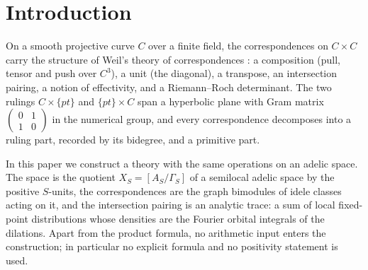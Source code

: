 \documentclass[11pt]{amsart}
\theoremstyle{definition}
\theoremstyle{remark}
\begin{document}
\maketitle

\tableofcontents

\section{Introduction}\label{sec:intro}

On a smooth projective curve $C$ over a finite field, the correspondences on
$C\times C$ carry the structure of Weil's theory of correspondences
\cite{Weil1948}: a composition (pull, tensor and push
over $C^{3}$), a unit (the diagonal), a transpose, an intersection pairing, a
notion of effectivity, and a Riemann--Roch determinant.  The two rulings
$C\times\{pt\}$ and $\{pt\}\times C$ span a hyperbolic plane with Gram matrix
$\left(\begin{smallmatrix}0&1\\1&0\end{smallmatrix}\right)$ in the numerical
group, and every correspondence decomposes into a ruling part, recorded by
its bidegree, and a primitive part.

In this paper we construct a theory with the same operations on an adelic
space.  The space is the quotient $X_S=[A_S/\Gamma_S]$ of a semilocal adelic
space by the positive $S$-units, the correspondences are the graph bimodules
of idele classes acting on it, and the intersection pairing is an analytic
trace: a sum of local fixed-point distributions whose densities are the
Fourier orbital integrals of the dilations.  Apart from the product formula,
no arithmetic input enters the construction; in particular no explicit
formula and no positivity statement is used.
\end{document}
